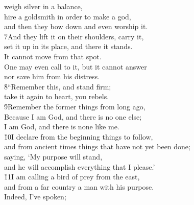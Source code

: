 \begin{poetry}
\poemll    weigh silver in a balance, \\
\poeml hire a goldsmith in order to make a god, \\
\poemll    and then they bow down and even worship it. \\
\poeml \v{7}And they lift it on their shoulders, carry it, \\
\poemll    set it up in its place, and there it stands. \\
\poemlll       It cannot move from that spot. \\
\poeml One may even call to it, but it cannot answer \\
\poemll    nor save him from his distress. \\
\poeml \v{8}``Remember this, and stand firm; \\
\poemll    take it again to heart, you rebels. \\
\poeml \v{9}Remember the former things from long ago, \\
\poemll    Because I am God, and there is no one else; \\
\poemlll       I am God, and there is none like me. \\
\poeml \v{10}I declare from the beginning things to follow, \\
\poemll    and from ancient times things that have not yet been done; \\
\poeml saying, `My purpose will stand, \\
\poemll    and he will accomplish everything that I please.' \\
\poeml \v{11}I am calling a bird of prey from the east, \\
\poemll    and from a far country a man with his purpose. \\
\poeml Indeed, I've spoken; \\

\end{poetry}
